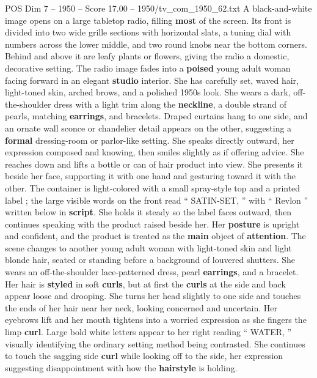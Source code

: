 \begin{textsample}{POS Dim 7 – 1950 – Score 17.00 – 1950/tv\_com\_1950\_62.txt}  \label{ex:f7_pos_008}
A black-and-white image opens on a large tabletop radio, filling \textbf{most} of the screen.
Its front is divided into two wide grille sections with horizontal slats, a tuning dial with numbers across the lower middle, and two round knobs near the bottom corners.
Behind and above it are leafy plants or flowers, giving the radio a domestic, decorative setting.
The radio image fades into a \textbf{poised} young adult woman facing forward in an elegant \textbf{studio} interior.
She has carefully set, waved hair, light-toned skin, arched brows, and a polished 1950s look.
She wears a dark, off-the-shoulder dress with a light trim along the \textbf{neckline}, a double strand of pearls, matching \textbf{earrings}, and bracelets.
Draped curtains hang to one side, and an ornate wall sconce or chandelier detail appears on the other, suggesting a \textbf{formal} dressing-room or parlor-like setting.
She speaks directly outward, her expression composed and knowing, then smiles slightly as if offering advice.
She reaches down and lifts a bottle or can of hair product into view.
She presents it beside her face, supporting it with one hand and gesturing toward it with the other.
The container is light-colored with a small spray-style top and a printed label ; the large visible words on the front read “ SATIN-SET, ” with “ Revlon ” written below in \textbf{script}.
She holds it steady so the label faces outward, then continues speaking with the product raised beside her.
Her \textbf{posture} is upright and confident, and the product is treated as the \textbf{main} object of \textbf{attention}.
The scene changes to another young adult woman with light-toned skin and light blonde hair, seated or standing before a background of louvered shutters.
She wears an off-the-shoulder lace-patterned dress, pearl \textbf{earrings}, and a bracelet.
Her hair is \textbf{styled} in soft \textbf{curls}, but at first the \textbf{curls} at the side and back appear loose and drooping.
She turns her head slightly to one side and touches the ends of her hair near her neck, looking concerned and uncertain.
Her eyebrows lift and her mouth tightens into a worried expression as she fingers the limp \textbf{curl}.
Large bold white letters appear to her right reading “ WATER, ” visually identifying the ordinary setting method being contrasted.
She continues to touch the sagging side \textbf{curl} while looking off to the side, her expression suggesting disappointment with how the \textbf{hairstyle} is holding.

\end{textsample}
